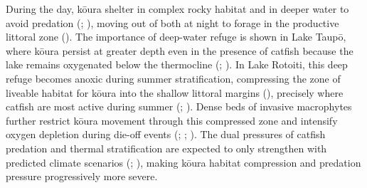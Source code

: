 \documentclass[
  letterpaper,
  DIV=11,
  numbers=noendperiod]{scrartcl}
\begin{document}
During the day, kōura shelter in complex rocky habitat and in deeper
water to avoid predation (;
), moving out of
both at night to forage in the productive littoral zone
(). The importance of deep-water
refuge is shown in Lake Taupō, where kōura persist at greater depth even
in the presence of catfish because the lake remains oxygenated below the
thermocline (;
). In Lake Rotoiti,
this deep refuge becomes anoxic during summer stratification,
compressing the zone of liveable habitat for kōura into the shallow
littoral margins (),
precisely where catfish are most active during summer
(;
). Dense beds of
invasive macrophytes further restrict kōura movement through this
compressed zone and intensify oxygen depletion during die-off events
(;
;
). The dual pressures of
catfish predation and thermal stratification are expected to only
strengthen with predicted climate scenarios
(;
), making kōura habitat
compression and predation pressure progressively more severe.
\end{document}
